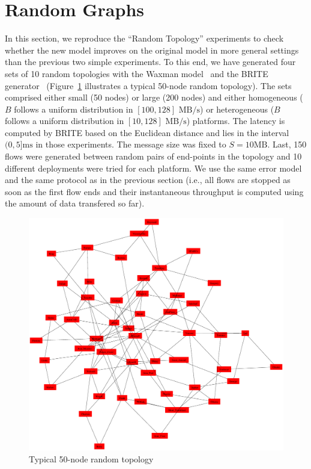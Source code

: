 \documentclass{sig-alternate}
\def\ie{i.e.,\xspace}
\def\ms{\ensuremath{\text{ms}}\xspace}%
\def\MBps{\ensuremath{\text{MB}/\text{s}}\xspace}%
\def\MB{\ensuremath{\text{MB}}\xspace}%
\begin{document}
\section{Random Graphs}
\label{sec.random}

In this section, we reproduce the ``Random Topology'' experiments to
check whether the new model improves on the original \simgrid model in
more general settings than the previous two simple experiments.  To
this end, we have generated four sets of 10 random topologies with the
Waxman model~\cite{Waxman88} and the BRITE generator~\cite{brite}
(Figure~\ref{fig:random} illustrates a typical 50-node random topology). The
sets comprised either small (50 nodes) or large (200 nodes) and either
homogeneous ($B$ follows a uniform distribution in $[100,128]$ \MBps)
or heterogeneous ($B$ follows a uniform distribution in $[10,128]$
\MBps) platforms. The latency is computed by BRITE based on the
Euclidean distance and lies in the interval $(0,5]$\ms in those
experiments. The message size was fixed to $S=10\MB$.
Last, 150 flows were generated between random pairs of end-points in
the topology and 10 different deployments were tried for each
platform. We use the same error model and the same protocol as in the
previous section (\ie all flows are stopped as soon as the first
flow ends and their instantaneous throughput is computed using the
amount of data transfered so far).

\begin{figure}
  \centering
  \includegraphics[width=\linewidth]{waxman-platform.eps}
  \caption{Typical 50-node random topology}
  \label{fig:random}
\end{figure}
\end{document}
